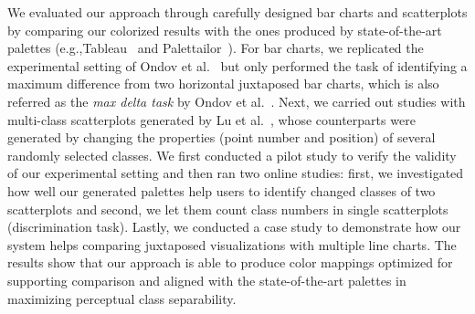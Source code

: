 
We evaluated our approach through carefully designed bar charts and scatterplots by comparing our colorized results with the ones produced by state-of-the-art palettes (e.g.,Tableau~\cite{tableau} and Palettailor~\cite{Lu21}). For bar charts, we replicated the experimental setting of Ondov et al.~\cite{Ondov19} but only performed the task of identifying a maximum difference from two horizontal juxtaposed bar charts, which is also referred as the \emph{max delta task} by Ondov et al.~\cite{Ondov19}.
Next, we carried out studies with multi-class scatterplots generated by Lu et al.~\cite{Lu21}, whose counterparts were generated by changing the properties (point number and position) of several randomly selected classes.
We first conducted a pilot study to verify the validity of our experimental setting and then ran two online studies: first, we investigated how well our generated palettes help users to identify changed classes of two scatterplots and second, we let them count class numbers in single scatterplots (discrimination task).
Lastly, we conducted a case study to demonstrate how our system helps comparing juxtaposed visualizations with multiple line charts.
The results show that our approach is able to produce color mappings optimized for supporting comparison and aligned with the state-of-the-art palettes in maximizing perceptual class separability.

